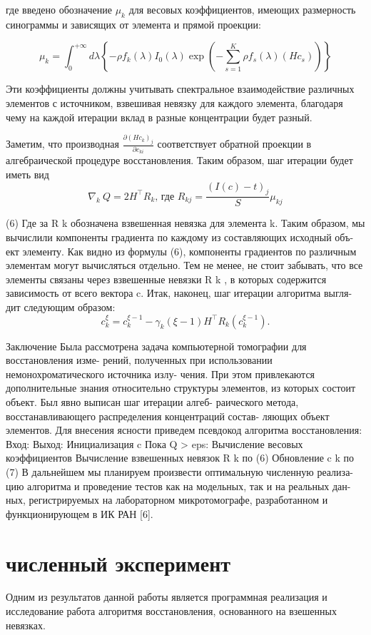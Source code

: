 где введено обозначение $\mu_k$ для весовых коэффициентов, имеющих размерность синограммы и зависящих от элемента и прямой проекции:

\begin{equation}
  \label{eq:weights}
  \mu_{k} = \int_0^{+\infty} {d\lambda \left\{
    -\rho f_k(\lambda) 
    I_0(\lambda)
    \exp{\left(
      -\sum_{s=1}^K {\rho f_s(\lambda) (H c_s)} 
         \right)}
    \right\}}
\end{equation}

Эти коэффициенты должны учитывать спектральное взаимодействие различных элементов с источником, взвешивая невязку для каждого элемента, благодаря чему на каждой итерации вклад в разные концентрации будет разный.

Заметим, что производная $\frac {\partial (H c_k)_j} {\partial c_{ki}}$ соответствует обратной проекции в алгебраической процедуре восстановления. 
Таким образом, шаг итерации будет иметь вид
\begin{equation}
  \nabla_k \ Q = 2H^\intercal R_k \text{, где } R_{kj} = \frac {(I(c) - t)_j} {S} \mu_{kj}
\end{equation}

(6)
Где за R k обозначена взвешенная невязка для элемента k. Таким образом, мы
вычислили компоненты градиента по каждому из составляющих исходный объ-
ект элементу. Как видно из формулы (6), компоненты градиентов по различным
элементам могут вычисляться отдельно. Тем не менее, не стоит забывать, что
все элементы связаны через взвешенные невязки R k , в которых содержится
зависимость от всего вектора c. Итак, наконец, шаг итерации алгоритма выгля-
дит следующим образом:
\begin{equation}
  \label{white_iteration}
  c_k^\xi = c_k^{\xi - 1} - \gamma_k (\xi - 1) H^\intercal R_k(c_k^{\xi - 1}).
\end{equation}

Заключение
Была рассмотрена задача компьютерной томографии для восстановления изме-
рений, полученных при использовании немонохроматического источника излу-
чения. При этом привлекаются дополнительные знания относительно структуры
элементов, из которых состоит объект. Был явно выписан шаг итерации алгеб-
раического метода, восстанавливающего распределения концентраций состав-
ляющих объект элементов.
Для внесения ясности приведем псевдокод алгоритма восстановления:
Вход: %
Выход: %
Инициализация c
Пока Q > eps:
Вычисление весовых коэффициентов %
Вычисление взвешенных невязок R k по (6)
Обновление c k по (7)
В дальнейшем мы планируем произвести оптимальную численную реализа-
цию алгоритма и проведение тестов как на модельных, так и на реальных дан-
ных, регистрируемых на лабораторном микротомографе, разработанном и
функционирующем в ИК РАН [6].

\section{численный эксперимент } \label{sect_3_2}
Одним из результатов данной работы является программная реализация и исследование работа алгоритмя восстановления, основанного на взешенных невязках.
